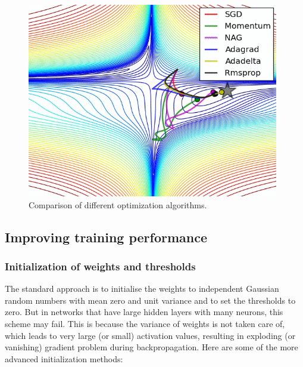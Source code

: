 	\vspace{4mm}
\begin{figure}[htb]
	\begin{center}
		\includegraphics*[width=11cm, keepaspectratio]{obr/opt.png}
	\end{center}
	\vspace{4mm}
	\caption{Comparison of different optimization algorithms. \cite{groman}} 
	\label{algorithms}
\end{figure}

\newpage
\subsection{Improving training performance}
\subsubsection{Initialization of weights and thresholds}

The standard approach is to initialise the weights to independent Gaussian random numbers with mean zero and unit variance and to set the thresholds to zero. But in networks that have large hidden layers with many neurons, this scheme may fail. This is because the variance of weights is not taken care of, which leads to very large (or small) activation values, resulting in exploding (or vanishing) gradient problem during backpropagation. \cite{mehlig} Here are some of the more advanced initialization methods: \cite{stanford-L6}

